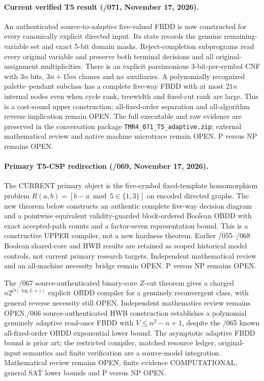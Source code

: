 \documentclass[11pt]{article}
\begin{document}
\paragraph{Current verified T5 result (/071, November 17, 2026).}
An authenticated source-to-\emph{adaptive} five-valued FBDD is now
constructed for every canonically explicit directed input. Its state
records the genuine remaining-variable set and exact 5-bit domain masks.
Reject-completion subprograms read every original variable and preserve
both terminal decisions and all original-assignment multiplicities.
There is an explicit parsimonious 3-bit-per-symbol CNF with $3n$
bits, $3n+15m$ clauses and no auxiliaries. A polynomially
recognized palette--pendant subclass has a complete five-way FBDD
with at most $21n$ internal nodes even when cycle rank, treewidth and
fixed-cut rank are large. This is a cost-sound upper construction;
all-fixed-order separation and all-algorithm reverse implication
remain OPEN. The full executable and raw evidence are preserved in
the conversation package \texttt{TMR4\_071\_T5\_adaptive.zip};
external mathematical review and native machine microtrace remain OPEN.
P versus NP remains OPEN.

\paragraph{Primary T5-CSP redirection (/069, November 17, 2026).}
The CURRENT primary object is the five-symbol fixed-template homomorphism
problem $R(a,b)=[b-a\bmod5\in\{1,3\}]$ on encoded directed graphs.
The new theorem below constructs an authentic complete five-way decision
diagram and a pointwise equivalent validity-guarded block-ordered Boolean
OBDD with exact accepted-path counts and a factor-seven representation
bound. This is a constructive UPPER compiler, not a new hardness theorem.
Earlier /055--/068 Boolean shared-core and HWB results are retained as
scoped historical model controls, not current primary research targets.
Independent mathematical review and an all-machine necessity bridge
remain OPEN. P versus NP remains OPEN.

The /067 source-authenticated binary-core $Z$-cut theorem gives a charged $n2^{O(\log L+z)}$ explicit OBDD compiler for a genuinely reconvergent class, with general reverse necessity still OPEN. Independent mathematics review remains OPEN.\n\nThe /066 source-authenticated HWB construction establishes a polynomial
genuinely adaptive read-once FBDD with $V\le n^2-n+1$, despite the
/065 known all-fixed-order OBDD exponential lower bound. The asymptotic
adaptive FBDD bound is prior art; the restricted compiler, matched
resource ledger, original-input semantics and finite verification are
a source-model integration. Mathematical review remains OPEN, finite
evidence COMPUTATIONAL, general SAT lower bounds and P versus NP OPEN.
\end{document}
